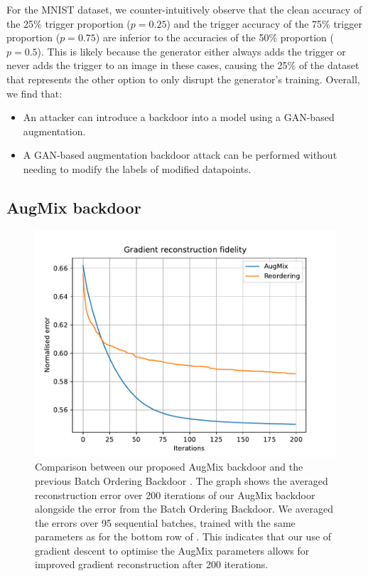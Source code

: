 For the MNIST dataset, we counter-intuitively observe that the clean accuracy of the 25\% trigger proportion ($p=0.25$) and the trigger accuracy of the 75\% trigger proportion ($p=0.75$) are inferior to the accuracies of the 50\% proportion ($p=0.5$). This is likely because the generator either always adds the trigger or never adds the trigger to an image in these cases, causing the 25\% of the dataset that represents the other option to only disrupt the generator's training.
Overall, we find that:
\begin{itemize}
  \item An attacker can introduce a backdoor into a model using a GAN-based augmentation.
  \item A GAN-based augmentation backdoor attack can be performed without needing to modify the labels of modified datapoints.
\end{itemize}

\subsection{AugMix backdoor}

\begin{figure}[h]
\vspace{-10pt}
\centering  
\includegraphics[scale=0.45]{figures/AugMix_error.pdf}
\vspace{-10pt}
\caption{Comparison between our proposed AugMix backdoor and the previous Batch Ordering Backdoor \citep{bob}. The graph shows the averaged reconstruction error over 200 iterations of our AugMix backdoor alongside the error from the Batch Ordering Backdoor. We averaged the errors over 95 sequential batches, trained with the same parameters as for the bottom row of . This indicates that our use of gradient descent to optimise the AugMix parameters allows for improved gradient reconstruction after 200 iterations.}
\label{fig:augmix}
\vspace{-5pt}
\end{figure}

